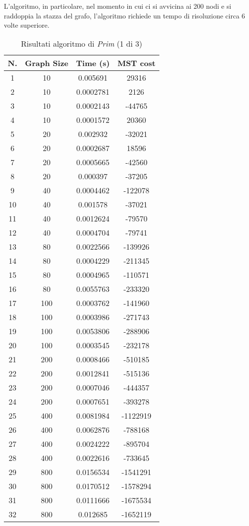 L'algoritmo, in particolare, nel momento in cui ci si avvicina ai 200 nodi e si raddoppia la stazza del grafo, l'algoritmo richiede un tempo di risoluzione circa 6 volte superiore.
\begin{table}[H]
	\centering
	\begin{tabular}{|c|c|c|c|}
		\hline
		\textbf{N.} & \textbf{Graph Size} & \textbf{Time (s)} & \textbf{MST cost}\\ 
		\hline
		1 & 10 & 0.005691 & 29316\\
		\hline
		2 & 10 & 0.0002781 & 2126\\
		\hline
		3 & 10 & 0.0002143 & -44765\\
		\hline
		4 & 10 & 0.0001572 & 20360\\
		\hline\hline
		5 & 20 & 0.002932 & -32021\\
		\hline
		6 & 20 & 0.0002687 & 18596\\
		\hline
		7 & 20 & 0.0005665 & -42560\\
		\hline
		8 & 20 & 0.000397 & -37205\\
		\hline\hline
		9 & 40 & 0.0004462 & -122078\\
		\hline
		10 & 40 & 0.001578 & -37021\\
		\hline
		11 & 40 & 0.0012624 & -79570\\
		\hline
		12 & 40 & 0.0004704 & -79741\\
		\hline\hline
		13 & 80 & 0.0022566 & -139926\\
		\hline
		14 & 80 & 0.0004229 & -211345\\
		\hline
		15 & 80 & 0.0004965 & -110571\\
		\hline
		16 & 80 & 0.0055763 & -233320\\
		\hline\hline
		17 & 100 & 0.0003762 & -141960\\
		\hline
		18 & 100 & 0.0003986 & -271743\\
		\hline
		19 & 100 & 0.0053806 & -288906\\
		\hline
		20 & 100 & 0.0003545 & -232178\\
		\hline\hline
		21 & 200 & 0.0008466 & -510185\\
		\hline
		22 & 200 & 0.0012841 & -515136\\
		\hline
		23 & 200 & 0.0007046 & -444357\\
		\hline
		24 & 200 & 0.0007651 & -393278\\
		\hline\hline
		25 & 400 & 0.0081984 & -1122919\\
		\hline
		26 & 400 & 0.0062876 & -788168\\
		\hline
		27 & 400 & 0.0024222 & -895704\\
		\hline
		28 & 400 & 0.0022616 & -733645\\
		\hline\hline
		29 & 800 & 0.0156534 & -1541291\\
		\hline
		30 & 800 & 0.0170512 & -1578294\\
		\hline
		31 & 800 & 0.0111666 & -1675534\\
		\hline
		32 & 800 & 0.012685 & -1652119\\
		\hline
	\end{tabular}
	\caption{Risultati algoritmo di \textit{Prim} (1 di 3)}
\end{table}


